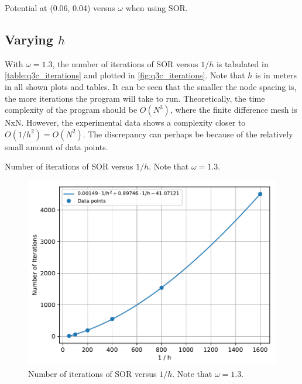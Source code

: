 \documentclass[a4paper,titlepage]{article}
\begin{document}
	\begin{table}[!htb]
		\centering
		\caption{Potential at (0.06, 0.04) versus $\omega$ when using SOR.}
		\label{table:q3b_potential}
	\end{table}
	
	\subsection{Varying $h$}
	
	With $\omega = 1.3$, the number of iterations of SOR versus $1/h$ is tabulated in \autoref{table:q3c_iterations} and plotted in \autoref{fig:q3c_iterations}. Note that $h$ is in meters in all shown plots and tables. It can be seen that the smaller the node spacing is, the more iterations the program will take to run. Theoretically, the time complexity of the program should be $O(N^3)$, where the finite difference mesh is NxN. However, the experimental data shows a complexity closer to $O(1/h^2) = O(N^2)$. The discrepancy can perhaps be because of the relatively small amount of data points.
	
	\begin{table}[!htb]
		\centering
		\caption{Number of iterations of SOR versus $1/h$. Note that $\omega=1.3$.}
		\label{table:q3c_iterations}
	\end{table}
	
	\begin{figure}[!htb]
		\centering
		\includegraphics[width=\columnwidth]{plots/q3c_iterations.pdf}
		\caption
		{Number of iterations of SOR versus $1/h$. Note that $\omega=1.3$.}
		\label{fig:q3c_iterations}
	\end{figure}
\end{document}
